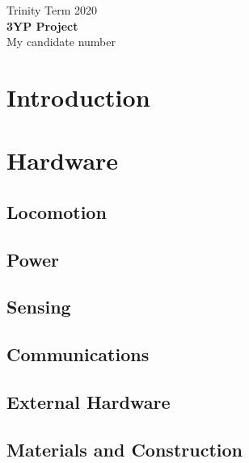 \documentclass[11pt]{article}		%
\begin{document}
	
	\flushleft
	\raggedright

	\begin{center}
		\vspace*{2cm}
		Trinity Term 2020\\ %
		\vspace*{6cm}
		 \huge{\textbf{{}3YP Project}}\\ 
		\vspace*{6cm}
		{\large{My candidate number}} %
		\thispagestyle{empty} %
	\end{center}

	\newpage
	
	\tableofcontents
	\thispagestyle{empty} %
	\newpage

	\setcounter{page}{1}
	
	\section{Introduction}
	
	\section{Hardware}
	
		\subsection{Locomotion}
		
		\subsection{Power}
		
		\subsection{Sensing}
		
		\subsection{Communications}
		
		\subsection{External Hardware}
	
		\subsection{Materials and Construction}
	
\end{document}

